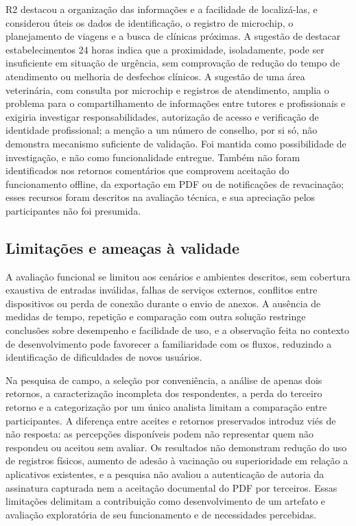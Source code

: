 \documentclass{UNESC}
\begin{document}
R2 destacou a organização das informações e a facilidade de localizá-las, e considerou úteis os dados de identificação, o registro de microchip, o planejamento de viagens e a busca de clínicas próximas. A sugestão de destacar estabelecimentos 24 horas indica que a proximidade, isoladamente, pode ser insuficiente em situação de urgência, sem comprovação de redução do tempo de atendimento ou melhoria de desfechos clínicos. A sugestão de uma área veterinária, com consulta por microchip e registros de atendimento, amplia o problema para o compartilhamento de informações entre tutores e profissionais e exigiria investigar responsabilidades, autorização de acesso e verificação de identidade profissional; a menção a um número de conselho, por si só, não demonstra mecanismo suficiente de validação. Foi mantida como possibilidade de investigação, e não como funcionalidade entregue. Também não foram identificados nos retornos comentários que comprovem aceitação do funcionamento offline, da exportação em PDF ou de notificações de revacinação; esses recursos foram descritos na avaliação técnica, e sua apreciação pelos participantes não foi presumida.

\subsection{Limitações e ameaças à validade}

A avaliação funcional se limitou aos cenários e ambientes descritos, sem cobertura exaustiva de entradas inválidas, falhas de serviços externos, conflitos entre dispositivos ou perda de conexão durante o envio de anexos. A ausência de medidas de tempo, repetição e comparação com outra solução restringe conclusões sobre desempenho e facilidade de uso, e a observação feita no contexto de desenvolvimento pode favorecer a familiaridade com os fluxos, reduzindo a identificação de dificuldades de novos usuários.

Na pesquisa de campo, a seleção por conveniência, a análise de apenas dois retornos, a caracterização incompleta dos respondentes, a perda do terceiro retorno e a categorização por um único analista limitam a comparação entre participantes. A diferença entre aceites e retornos preservados introduz viés de não resposta: as percepções disponíveis podem não representar quem não respondeu ou aceitou sem avaliar. Os resultados não demonstram redução do uso de registros físicos, aumento de adesão à vacinação ou superioridade em relação a aplicativos existentes, e a pesquisa não avaliou a autenticação de autoria da assinatura capturada nem a aceitação documental do PDF por terceiros. Essas limitações delimitam a contribuição como desenvolvimento de um artefato e avaliação exploratória de seu funcionamento e de necessidades percebidas.
\end{document}

